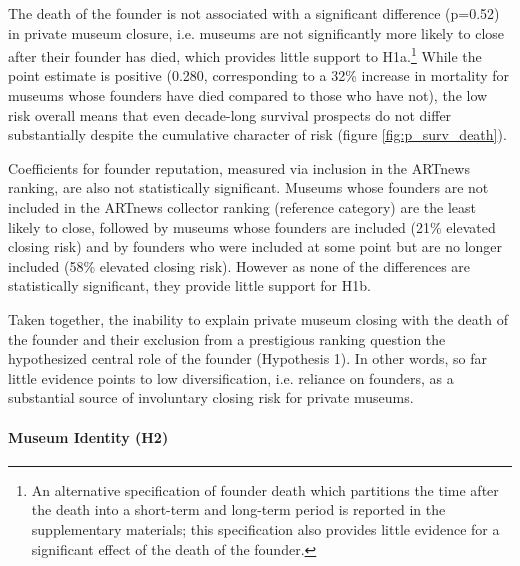 \documentclass[12pt]{article}
\begin{document}
The death of the founder is not associated with a significant difference (p=0.52) in private museum closure, i.e. museums are not significantly more likely to close after their founder has died, which provides little support to H1a.\footnote{An alternative specification of founder death which partitions the time after the death into a short-term and long-term period is reported in the supplementary materials; this specification also provides little evidence for a significant effect of the death of the founder.}
While the point estimate is positive (0.280, corresponding to a 32\% increase in mortality for museums whose founders have died compared to those who have not), the low risk overall means that even decade-long survival prospects do not differ substantially despite the cumulative character of risk (figure \ref{fig:p_surv_death}).



Coefficients for founder reputation, measured via inclusion in the ARTnews ranking, are also not statistically significant.
Museums whose founders are not included in the ARTnews collector ranking (reference category) are the least likely to close, followed by museums whose founders are included (21\% elevated closing risk) and by founders who were included at some point but are no longer included (58\% elevated closing risk).
However as none of the differences are statistically significant, they provide little support for H1b.




Taken together, the inability to explain private museum closing with the death of the founder and their exclusion from a prestigious ranking question the hypothesized central role of the founder (Hypothesis 1).
In other words, so far little evidence points to low diversification, i.e. reliance on founders, as a substantial source of involuntary closing risk for private museums.
\paragraph*{Museum Identity (H2)}
\end{document}
